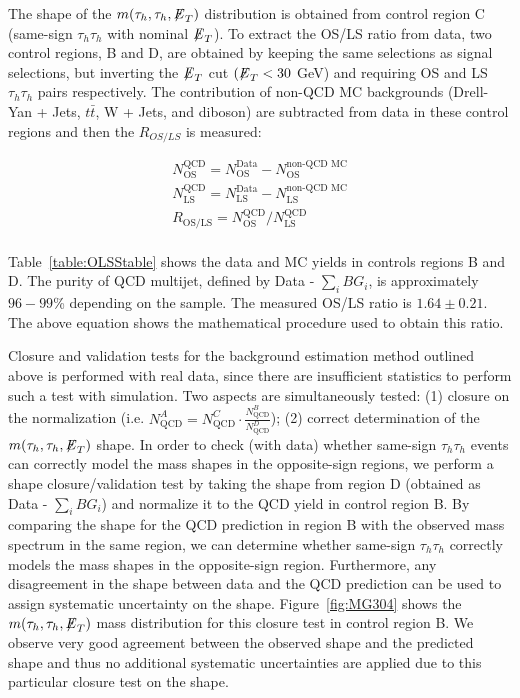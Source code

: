 The shape of the $m(\tau_{h},\tau_{h},{\not\mathrel{E}}_T)$ distribution is obtained from control region C (same-sign $\tau_{h}\tau_{h}$ with nominal ${\not\mathrel{E}}_T$). To extract the OS/LS ratio from data, two control regions, B and D, are obtained by keeping the same selections as signal selections, but inverting the ${\not\mathrel{E}}_T$ cut $({\not\mathrel{E}}_T < 30$ GeV) and requiring OS and LS $\tau_{h}\tau_{h}$ pairs respectively. The contribution of non-QCD MC backgrounds (Drell-Yan + Jets, $t\bar{t}$, W + Jets, and diboson) are subtracted from data in these control regions and then the $R_{OS/LS}$ is measured:

\begin{center}
\begin{eqnarray}
 N^{\textrm{QCD}}_{\textrm{OS}} = N^{\textrm{Data}}_{\textrm{OS}} - N^{\textrm{non-QCD MC}}_{\textrm{OS}} \nonumber\\
 N^{\textrm{QCD}}_{\textrm{LS}} = N^{\textrm{Data}}_{\textrm{LS}} - N^{\textrm{non-QCD MC}}_{\textrm{LS}} \\  
R_{\textrm{OS/LS}} = N^{\textrm{QCD}}_{\textrm{OS}}/N^{\textrm{QCD}}_{\textrm{LS}} \nonumber\\ 
\label{eqn:OSLSratio}
\end{eqnarray}
\end{center}

Table~\ref{table:OLSStable} shows the data and MC yields in controls regions B and D. The purity of QCD multijet, defined by Data - $\sum\limits_{i} BG_{i}$, is 
approximately $96-99$\% depending on the sample. The measured OS/LS ratio is $1.64\pm0.21$. The above equation shows the mathematical procedure used to obtain 
this ratio. 

Closure and validation tests for the background estimation method outlined above is performed with real data, since there are insufficient statistics to perform 
such a test with simulation. Two aspects are simultaneously tested: (1) closure on the normalization (i.e. $N_{\textrm{QCD}}^{A} = N_{\textrm{QCD}}^{C} \cdot 
\frac{N_{\textrm{QCD}}^{B}}{N_{\textrm{QCD}}^{D}}$); (2) correct determination of the $m(\tau_{h},\tau_{h},{\not\mathrel{E}}_T)$ shape. In order to check (with data) whether same-sign $\tau_{h}\tau_{h}$ events can correctly model the mass shapes in the opposite-sign regions, we perform a shape closure/validation test by taking the shape from region D (obtained as Data - $\sum\limits_{i} BG_{i}$) and normalize it to the QCD yield in control region B. By comparing the
shape for the QCD prediction in region B with the observed mass spectrum in the same region, we can determine whether same-sign $\tau_{h}\tau_{h}$ correctly models the mass shapes in the opposite-sign region. Furthermore, any disagreement in the shape between data and the QCD prediction can be used to assign systematic uncertainty on the shape. Figure~\ref{fig:MG304} shows the $m(\tau_{h},\tau_{h},{\not\mathrel{E}}_T)$ mass distribution for this closure test in control region B. We observe very good agreement between the observed shape and the predicted shape and thus no additional
systematic uncertainties are applied due to this particular closure test on the shape. 



